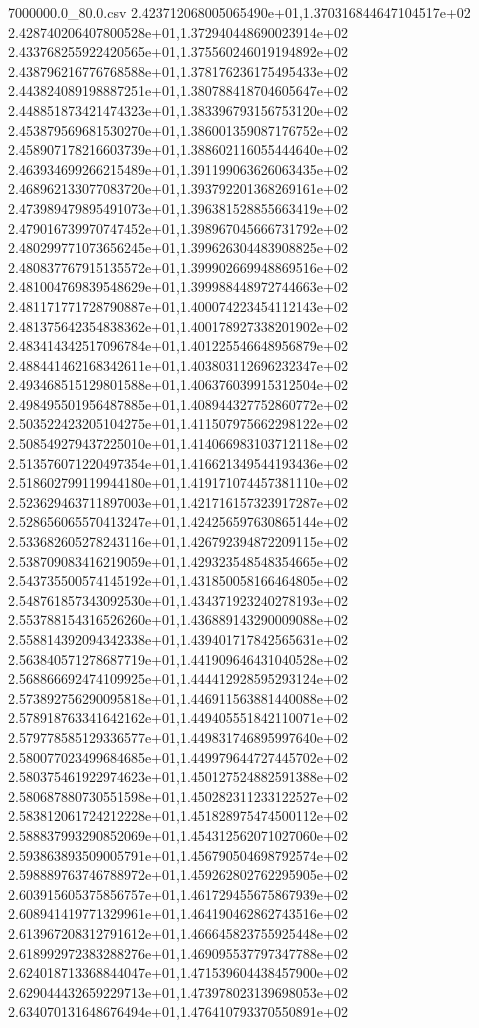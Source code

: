 \begin{filecontents*}{7000000.0_80.0.csv}
2.423712068005065490e+01,1.370316844647104517e+02
2.428740206407800528e+01,1.372940448690023914e+02
2.433768255922420565e+01,1.375560246019194892e+02
2.438796216776768588e+01,1.378176236175495433e+02
2.443824089198887251e+01,1.380788418704605647e+02
2.448851873421474323e+01,1.383396793156753120e+02
2.453879569681530270e+01,1.386001359087176752e+02
2.458907178216603739e+01,1.388602116055444640e+02
2.463934699266215489e+01,1.391199063626063435e+02
2.468962133077083720e+01,1.393792201368269161e+02
2.473989479895491073e+01,1.396381528855663419e+02
2.479016739970747452e+01,1.398967045666731792e+02
2.480299771073656245e+01,1.399626304483908825e+02
2.480837767915135572e+01,1.399902669948869516e+02
2.481004769839548629e+01,1.399988448972744663e+02
2.481171771728790887e+01,1.400074223454112143e+02
2.481375642354838362e+01,1.400178927338201902e+02
2.483414342517096784e+01,1.401225546648956879e+02
2.488441462168342611e+01,1.403803112696232347e+02
2.493468515129801588e+01,1.406376039915312504e+02
2.498495501956487885e+01,1.408944327752860772e+02
2.503522423205104275e+01,1.411507975662298122e+02
2.508549279437225010e+01,1.414066983103712118e+02
2.513576071220497354e+01,1.416621349544193436e+02
2.518602799119944180e+01,1.419171074457381110e+02
2.523629463711897003e+01,1.421716157323917287e+02
2.528656065570413247e+01,1.424256597630865144e+02
2.533682605278243116e+01,1.426792394872209115e+02
2.538709083416219059e+01,1.429323548548354665e+02
2.543735500574145192e+01,1.431850058166464805e+02
2.548761857343092530e+01,1.434371923240278193e+02
2.553788154316526260e+01,1.436889143290009088e+02
2.558814392094342338e+01,1.439401717842565631e+02
2.563840571278687719e+01,1.441909646431040528e+02
2.568866692474109925e+01,1.444412928595293124e+02
2.573892756290095818e+01,1.446911563881440088e+02
2.578918763341642162e+01,1.449405551842110071e+02
2.579778585129336577e+01,1.449831746895997640e+02
2.580077023499684685e+01,1.449979644727445702e+02
2.580375461922974623e+01,1.450127524882591388e+02
2.580687880730551598e+01,1.450282311233122527e+02
2.583812061724212228e+01,1.451828975474500112e+02
2.588837993290852069e+01,1.454312562071027060e+02
2.593863893509005791e+01,1.456790504698792574e+02
2.598889763746788972e+01,1.459262802762295905e+02
2.603915605375856757e+01,1.461729455675867939e+02
2.608941419771329961e+01,1.464190462862743516e+02
2.613967208312791612e+01,1.466645823755925448e+02
2.618992972383288276e+01,1.469095537797347788e+02
2.624018713368844047e+01,1.471539604438457900e+02
2.629044432659229713e+01,1.473978023139698053e+02
2.634070131648676494e+01,1.476410793370550891e+02

\end{filecontents*}
